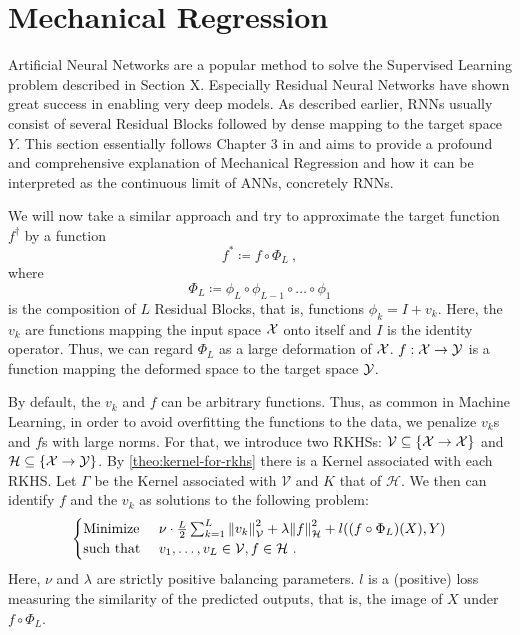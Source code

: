 \section{Mechanical Regression}

Artificial Neural Networks are a popular method to solve the Supervised Learning problem described in Section X.
Especially Residual Neural Networks have shown great success in enabling very deep models.
As described earlier, RNNs usually consist of several Residual Blocks followed by dense mapping to the target space $Y$.
This section essentially follows Chapter 3 in \cite{owhadi20} and aims to provide a profound and comprehensive explanation of Mechanical Regression and how it can be interpreted as the continuous limit of ANNs, concretely RNNs.



We will now take a similar approach and try to approximate the target function $f^\dagger$ by a function
\begin{equation}
	f^\ast \coloneqq f \circ \Phi_L \ ,
\end{equation}
where 
\begin{equation}
	\Phi_L \coloneqq \phi_L \circ \phi_{L-1} \circ \ldots \circ \phi_1
\end{equation} 
is the composition of $L$ Residual Blocks, that is, functions $\phi_k = I + v_k$.
Here, the $v_k$ are functions mapping the input space $\mathcal{X}$ onto itself and $I$ is the identity operator.
Thus, we can regard $\Phi_L$ as a large deformation of $\mathcal{X}$.
$f: \mathcal{X} \to \mathcal{Y}$ is a function mapping the deformed space to the target space $\mathcal{Y}$.

By default, the $v_k$ and $f$ can be arbitrary functions.
Thus, as common in Machine Learning, in order to avoid overfitting the functions to the data, we penalize $v_k$s and $f$s with large norms.
For that, we introduce two RKHSs:
$\mathcal{V} \subseteq \{\mathcal{X} \rightarrow \mathcal{X}\}$ and $\mathcal{H} \subseteq \{\mathcal{X} \rightarrow \mathcal{Y}\}$. 
By \cref{theo:kernel-for-rkhs} there is a Kernel associated with each RKHS.
Let $\Gamma$ be the Kernel associated with $\mathcal{V}$ and $K$ that of $\mathcal{H}$.
We then can identify $f$ and the $v_k$ as solutions to the following problem:
\begin{equation}
	\label{eq:min-v-f}
	\begin{cases}
		\text{Minimize~} & \nu \cdot \frac{L}{2} \sum_{k=1}^{L} \norm{v_k}_\mathcal{V}^2
		+ \lambda \norm{f}_\mathcal{H}^2 
		+ l((f \circ \Phi_L)(X), Y) \\
		\text{such that~} & v_1, \ldots, v_L \in \mathcal{V}, f \in \mathcal{H} \ .
	\end{cases}
\end{equation}
Here, $\nu$ and $\lambda$ are strictly positive balancing parameters.
$l$ is a (positive) loss measuring the similarity of the predicted outputs, that is, the image of $X$ under $f \circ \Phi_L$.

